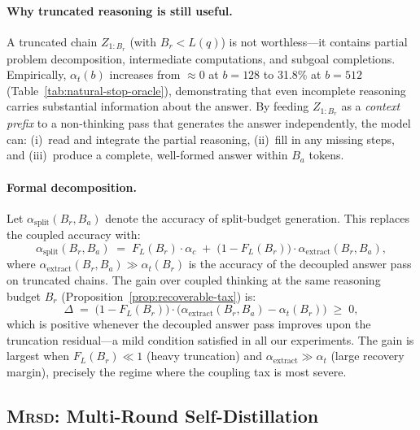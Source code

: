 \paragraph{Why truncated reasoning is still useful.}
A truncated chain $Z_{1:B_r}$ (with $B_r < L(q)$) is not worthless---it
contains partial problem decomposition, intermediate computations, and
subgoal completions.
Empirically, $\alpha_t(b)$ increases from ${\approx}0$ at $b{=}128$ to 31.8\%
at $b{=}512$ (Table~\ref{tab:natural-stop-oracle}), demonstrating that
even incomplete reasoning carries substantial information about the answer.
By feeding $Z_{1:B_r}$ as a \emph{context prefix} to a non-thinking pass
that generates the answer independently, the model can:
(i)~read and integrate the partial reasoning,
(ii)~fill in any missing steps, and
(iii)~produce a complete, well-formed answer within $B_a$ tokens.

\paragraph{Formal decomposition.}
Let $\alpha_{\mathrm{split}}(B_r, B_a)$ denote the accuracy of
split-budget generation.
This replaces the coupled accuracy with:
\begin{equation}
  \label{eq:split-acc}
  \alpha_{\mathrm{split}}(B_r, B_a)
  \;=\; F_L(B_r) \cdot \alpha_c
  \;+\; \bigl(1 - F_L(B_r)\bigr) \cdot
    \alpha_{\mathrm{extract}}(B_r, B_a),
\end{equation}
where $\alpha_{\mathrm{extract}}(B_r, B_a) \gg \alpha_t(B_r)$ is the
accuracy of the decoupled answer pass on truncated chains.
The gain over coupled thinking at the same reasoning budget $B_r$
(Proposition~\ref{prop:recoverable-tax}) is:
\begin{equation}
  \label{eq:split-gain}
  \Delta \;=\; \bigl(1 - F_L(B_r)\bigr) \cdot
    \bigl(\alpha_{\mathrm{extract}}(B_r, B_a) - \alpha_t(B_r)\bigr)
  \;\ge\; 0,
\end{equation}
which is positive whenever the decoupled answer pass improves upon the
truncation residual---a mild condition satisfied in all our experiments.
The gain is largest when $F_L(B_r) \ll 1$ (heavy truncation) and
$\alpha_{\mathrm{extract}} \gg \alpha_t$ (large recovery margin),
precisely the regime where the coupling tax is most severe.

\subsection{\textsc{Mrsd}: Multi-Round Self-Distillation}
\label{sec:method:mrsd}


